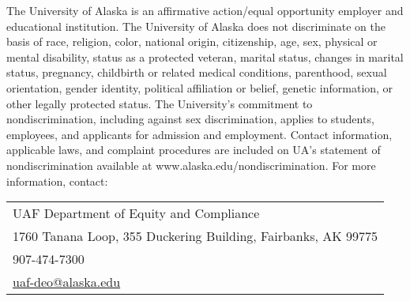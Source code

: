 \documentclass[12pt]{article}
\def\mailto#1{\href{mailto:#1}{#1}}
\begin{document}
The University of Alaska is an affirmative action/equal opportunity employer and educational institution. The University of Alaska does not discriminate on the basis of race, religion, color, national origin, citizenship, age, sex, physical or mental disability, status as a protected veteran, marital status, changes in marital status, pregnancy, childbirth or related medical conditions, parenthood, sexual orientation, gender identity, political affiliation or belief, genetic information, or other legally protected status. The University's commitment to nondiscrimination, including against sex discrimination, applies to students, employees, and applicants for admission and employment. Contact information, applicable laws, and complaint procedures are included on UA's statement of nondiscrimination available at www.alaska.edu/nondiscrimination. For more information, contact:

\begin{tabular}{l}
UAF Department of Equity and Compliance\\
1760 Tanana Loop, 355 Duckering Building, Fairbanks, AK  99775\\
907-474-7300\\
\mailto{uaf-deo@alaska.edu}
\end{tabular}
\end{document}
